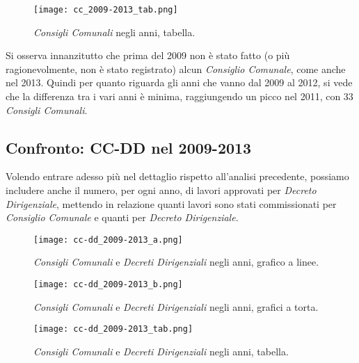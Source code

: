 			\begin{figure}[h!]
				\centering
					\texttt{[image: cc\_2009-2013\_tab.png]}
				\caption{\textit{Consigli Comunali} negli anni, tabella.}
				\label{fig:cc_2009-2013_tab}
			\end{figure}
			
			Si osserva innanzitutto che prima del 2009 non è stato fatto (o più ragionevolmente, non è stato registrato) alcun \textit{Consiglio Comunale}, come anche nel 2013. Quindi per quanto riguarda gli anni che vanno dal 2009 al 2012, si vede che la differenza tra i vari anni è minima, raggiungendo un picco nel 2011, con 33 \textit{Consigli Comunali}.
			
			\FloatBarrier
			
		\subsection{Confronto: CC-DD nel 2009-2013} \label{subsec:cc-dd_2009-2013}
		
			Volendo entrare adesso più nel dettaglio rispetto all'analisi precedente, possiamo includere anche il numero, per ogni anno, di lavori approvati per \textit{Decreto Dirigenziale}, mettendo in relazione quanti lavori sono stati commissionati per \textit{Consiglio Comunale} e quanti per \textit{Decreto Dirigenziale}.\\
			
			\begin{figure}[h!]
				\centering
					\texttt{[image: cc-dd\_2009-2013\_a.png]}
				\caption{\textit{Consigli Comunali} e \textit{Decreti Dirigenziali} negli anni, grafico a linee.}
				\label{fig:cc-dd_2009-2013_a}
			\end{figure}
			
			\begin{figure}[h!]
				\centering
					\texttt{[image: cc-dd\_2009-2013\_b.png]}
				\caption{\textit{Consigli Comunali} e \textit{Decreti Dirigenziali} negli anni, grafici a torta.}
				\label{fig:cc-dd_2009-2013_b}
			\end{figure}
			
			\begin{figure}[h!]
				\centering
					\texttt{[image: cc-dd\_2009-2013\_tab.png]}
				\caption{\textit{Consigli Comunali} e \textit{Decreti Dirigenziali} negli anni, tabella.}
				\label{fig:cc-dd_2009-2013_tab}
			\end{figure}
			
